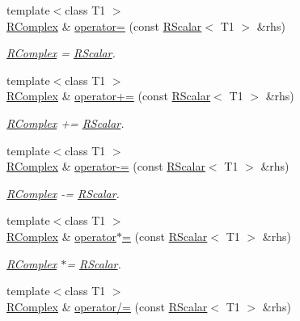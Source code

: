 \begin{DoxyCompactItemize}
{\footnotesize template$<$class T1 $>$ }\\\mbox{\hyperlink{classENSEM_1_1RComplex}{R\+Complex}} \& \mbox{\hyperlink{classENSEM_1_1RComplex_a6553ee6381e82a410c0c531fde8e3fee}{operator=}} (const \mbox{\hyperlink{classENSEM_1_1RScalar}{R\+Scalar}}$<$ T1 $>$ \&rhs)
\begin{DoxyCompactList}\small\item\em \mbox{\hyperlink{classENSEM_1_1RComplex}{R\+Complex}} = \mbox{\hyperlink{classENSEM_1_1RScalar}{R\+Scalar}}. \end{DoxyCompactList}\item 
{\footnotesize template$<$class T1 $>$ }\\\mbox{\hyperlink{classENSEM_1_1RComplex}{R\+Complex}} \& \mbox{\hyperlink{classENSEM_1_1RComplex_a0a7beaab81b8f5e2129a4c7b1074f85c}{operator+=}} (const \mbox{\hyperlink{classENSEM_1_1RScalar}{R\+Scalar}}$<$ T1 $>$ \&rhs)
\begin{DoxyCompactList}\small\item\em \mbox{\hyperlink{classENSEM_1_1RComplex}{R\+Complex}} += \mbox{\hyperlink{classENSEM_1_1RScalar}{R\+Scalar}}. \end{DoxyCompactList}\item 
{\footnotesize template$<$class T1 $>$ }\\\mbox{\hyperlink{classENSEM_1_1RComplex}{R\+Complex}} \& \mbox{\hyperlink{classENSEM_1_1RComplex_af071c8c8f4d2a2cf17a9e4b01accf6bc}{operator-\/=}} (const \mbox{\hyperlink{classENSEM_1_1RScalar}{R\+Scalar}}$<$ T1 $>$ \&rhs)
\begin{DoxyCompactList}\small\item\em \mbox{\hyperlink{classENSEM_1_1RComplex}{R\+Complex}} -\/= \mbox{\hyperlink{classENSEM_1_1RScalar}{R\+Scalar}}. \end{DoxyCompactList}\item 
{\footnotesize template$<$class T1 $>$ }\\\mbox{\hyperlink{classENSEM_1_1RComplex}{R\+Complex}} \& \mbox{\hyperlink{classENSEM_1_1RComplex_aaf2adc526cdbb0b29931b21311cd74fe}{operator$\ast$=}} (const \mbox{\hyperlink{classENSEM_1_1RScalar}{R\+Scalar}}$<$ T1 $>$ \&rhs)
\begin{DoxyCompactList}\small\item\em \mbox{\hyperlink{classENSEM_1_1RComplex}{R\+Complex}} $\ast$= \mbox{\hyperlink{classENSEM_1_1RScalar}{R\+Scalar}}. \end{DoxyCompactList}\item 
{\footnotesize template$<$class T1 $>$ }\\\mbox{\hyperlink{classENSEM_1_1RComplex}{R\+Complex}} \& \mbox{\hyperlink{classENSEM_1_1RComplex_ace62972244741ac0abcf1d3d1e833604}{operator/=}} (const \mbox{\hyperlink{classENSEM_1_1RScalar}{R\+Scalar}}$<$ T1 $>$ \&rhs)

\end{DoxyCompactItemize}
